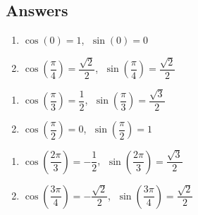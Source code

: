 \newpage

\subsection{Answers}

\begin{multicols}{2}

\begin{enumerate}

\item $\cos(0) = 1$, $\; \sin(0) = 0$ 

\item $\cos \left(\dfrac{\pi}{4} \right) = \dfrac{\sqrt{2}}{2}$, $\; \sin \left(\dfrac{\pi}{4} \right) = \dfrac{\sqrt{2}}{2}$

\setcounter{HW}{\value{enumi}}

\end{enumerate}

\end{multicols}

\begin{multicols}{2}

\begin{enumerate}

\setcounter{enumi}{\value{HW}}

\item $\cos \left(\dfrac{\pi}{3}\right) = \dfrac{1}{2}$, $\; \sin \left(\dfrac{\pi}{3}\right) = \dfrac{\sqrt{3}}{2}$

\item $\cos \left(\dfrac{\pi}{2}\right) = 0$, $\; \sin \left(\dfrac{\pi}{2}\right) = 1$ 

\setcounter{HW}{\value{enumi}}

\end{enumerate}

\end{multicols}

\begin{multicols}{2}

\begin{enumerate}

\setcounter{enumi}{\value{HW}}

\item $\cos\left(\dfrac{2\pi}{3}\right) = -\dfrac{1}{2}$, $\; \sin \left(\dfrac{2\pi}{3}\right) = \dfrac{\sqrt{3}}{2}$

\item $\cos \left(\dfrac{3\pi}{4} \right) = -\dfrac{\sqrt{2}}{2}$, $\; \sin \left(\dfrac{3\pi}{4} \right) = \dfrac{\sqrt{2}}{2}$

\setcounter{HW}{\value{enumi}}

\end{enumerate}

\end{multicols}


